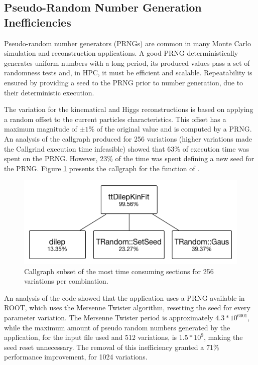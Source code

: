 \subsection{Pseudo-Random Number Generation Inefficiencies}

Pseudo-random number generators (PRNGs) are common in many Monte Carlo simulation and reconstruction applications. A good PRNG deterministically generates uniform numbers with a long period, its produced values pass a set of randomness tests and, in HPC, it must be efficient and scalable. Repeatability is ensured by providing a seed to the PRNG prior to number generation, due to their deterministic execution.

The variation for the kinematical and Higgs reconstructions is based on applying a random offset to the current particles characteristics. This offset has a maximum magnitude of $\pm1\%$ of the original value and is computed by a PRNG. An analysis of the callgraph produced for 256 variations (higher variations made the Callgrind execution time infeasible) showed that 63\% of \tth execution time was spent on the PRNG. However, 23\% of the time was spent defining a new seed for the PRNG. Figure \ref{fig:prng256} presents the callgraph for the \ttDilepKinFit function of \tth.

\begin{figure}[!htp]
	\begin{center}
		\includegraphics[scale=0.5]{images/prng_256_edited.png}
		\caption{Callgraph subset of the \ttDilepKinFit most time consuming sections for 256 variations per combination.}
		\label{fig:prng256}
	\end{center}
\end{figure}

An analysis of the code showed that the application uses a PRNG available in ROOT, which uses the Mersenne Twister algorithm, resetting the seed for every parameter variation. The Mersenne Twister period is approximately $4.3 * 10^{6001}$, while the maximum amount of pseudo random numbers generated by the application, for the input file used and 512 variations, is $1.5 * 10^9$, making the seed reset unnecessary. The removal of this inefficiency granted a 71\% performance improvement, for 1024 variations.

